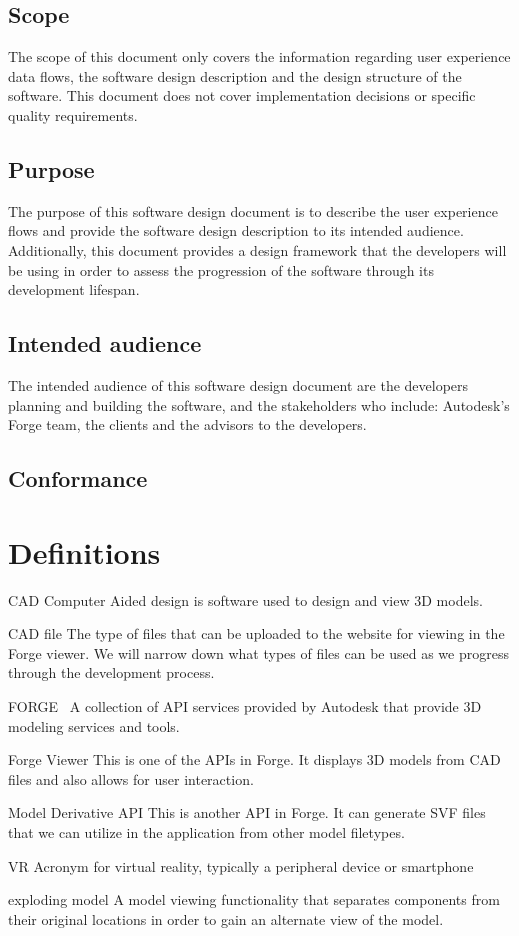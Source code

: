 \documentclass[letterpaper, 10pt, draftclsnofoot, compsoc, onecolumn]{IEEEtran}
\begin{document}
\subsection{Scope}
The scope of this document only covers the information regarding user experience data flows, the software design description and the design structure of the software. This document does not cover implementation decisions or specific quality requirements.
\subsection{Purpose}
The purpose of this software design document is to describe the user experience flows and provide the software design description to its intended audience. Additionally, this document provides a design framework that the developers will be using in order to assess the progression of the software through its development lifespan.
\subsection{Intended audience}
The intended audience of this software design document are the developers planning and building the software, and the stakeholders who include: Autodesk's Forge team, the clients and the advisors to the developers.
\subsection{Conformance}

\section{Definitions}
	\begin{description}
	\item{CAD} Computer Aided design is software used to design and view 3D models.

	\item{CAD file} The type of files that can be uploaded to the website for viewing in the Forge viewer. 
	We will  narrow down what types of files can be used as we progress through the development process.

	\item{FORGE}~\cite{forge2016} A collection of API services provided by Autodesk that provide 3D modeling services and tools.

	\item{Forge Viewer} This is one of the APIs in Forge. It displays 3D models from CAD files and also allows
	for user interaction.
	
	\item{Model Derivative API} This is another API in Forge. It can generate SVF files that we can utilize in the application from other model filetypes.
	
	\item{VR} Acronym for virtual reality, typically a peripheral device or smartphone
	\item{exploding model} A model viewing functionality that separates components from their original locations in order to gain an alternate view of the model.
	\end{description} 
	
\end{document}
